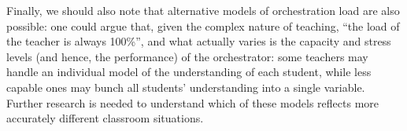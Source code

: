 \documentclass[10pt,journal,compsoc]{IEEEtran}
\begin{document}
Finally, we should also note that alternative models of orchestration load are also possible: one could argue that, given the complex nature of teaching, ``the load of the teacher is always 100\%'', and what actually varies is the capacity and stress levels (and hence, the performance) of the orchestrator: some teachers may handle an individual model of the understanding of each student, while less capable ones may bunch all students' understanding into a single variable. Further research is needed to understand which of these models reflects more accurately different classroom situations.


\end{document}
